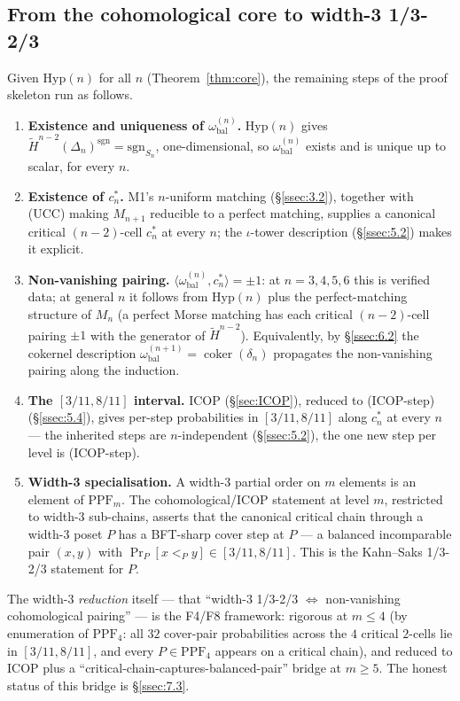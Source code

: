 \documentclass[11pt,reqno]{amsart}
\theoremstyle{plain}
\theoremstyle{definition}
\newcommand{\PPF}{\mathrm{PPF}}
\newcommand{\Hred}{\widetilde H}
\newcommand{\sgn}{\mathrm{sgn}}
\newcommand{\Hyp}{\mathrm{Hyp}}
\newcommand{\omegabal}[1]{\omega_{\mathrm{bal}}^{(#1)}}
\newcommand{\cstar}[1]{c^{*}_{#1}}
\newcommand{\UCC}{\textup{(UCC)}}
\newcommand{\ICOPstep}{\textup{(ICOP-step)}}
\begin{document}
\subsection{From the cohomological core to width-3 1/3-2/3}\label{ssec:6.6}
Given $\Hyp(n)$ for all $n$ (Theorem~\ref{thm:core}), the remaining
steps of the proof skeleton run as follows.
\begin{enumerate}[leftmargin=2em,label=(\arabic*)]
  \item \textbf{Existence and uniqueness of $\omegabal n$.} $\Hyp(n)$
        gives $\Hred^{n-2}(\Delta_n)^{\sgn}=\sgn_{S_n}$,
        one-dimensional, so $\omegabal n$ exists and is unique up to
        scalar, for every $n$.
  \item \textbf{Existence of $\cstar n$.} M1's $n$-uniform matching
        (\S\ref{ssec:3.2}), together with \UCC{} making $M_{n+1}$
        reducible to a perfect matching, supplies a canonical critical
        $(n-2)$-cell $\cstar n$ at every $n$; the $\iota$-tower
        description (\S\ref{ssec:5.2}) makes it explicit.
  \item \textbf{Non-vanishing pairing.}
        $\langle\omegabal n,\cstar n\rangle=\pm1$: at $n=3,4,5,6$ this
        is verified data; at general $n$ it follows from $\Hyp(n)$ plus
        the perfect-matching structure of $M_n$ (a perfect Morse
        matching has each critical $(n-2)$-cell pairing $\pm1$ with the
        generator of $\Hred^{n-2}$). Equivalently, by \S\ref{ssec:6.2}
        the cokernel description
        $\omegabal{n+1}=\operatorname{coker}(\delta_n)$ propagates the
        non-vanishing pairing along the induction.
  \item \textbf{The $[3/11,8/11]$ interval.} ICOP (\S\ref{sec:ICOP}),
        reduced to \ICOPstep{} (\S\ref{ssec:5.4}), gives per-step
        probabilities in $[3/11,8/11]$ along $\cstar n$ at every $n$ ---
        the inherited steps are $n$-independent (\S\ref{ssec:5.2}), the
        one new step per level is \ICOPstep.
  \item \textbf{Width-3 specialisation.} A width-3 partial order on $m$
        elements is an element of $\PPF_m$. The cohomological/ICOP
        statement at level $m$, restricted to width-3 sub-chains,
        asserts that the canonical critical chain through a width-3
        poset $P$ has a BFT-sharp cover step at $P$ --- a balanced
        incomparable pair $(x,y)$ with $\Pr_P[x<_Py]\in[3/11,8/11]$.
        This is the Kahn--Saks 1/3-2/3 statement for $P$.
\end{enumerate}
The width-3 \emph{reduction} itself --- that ``width-3 1/3-2/3
$\Longleftrightarrow$ non-vanishing cohomological pairing'' --- is the
F4/F8 framework: rigorous at $m\le4$ (by enumeration of $\PPF_4$: all
$32$ cover-pair probabilities across the $4$ critical $2$-cells lie in
$[3/11,8/11]$, and every $P\in\PPF_4$ appears on a critical chain), and
reduced to ICOP plus a ``critical-chain-captures-balanced-pair'' bridge
at $m\ge5$. The honest status of this bridge is \S\ref{ssec:7.3}.
\end{document}
